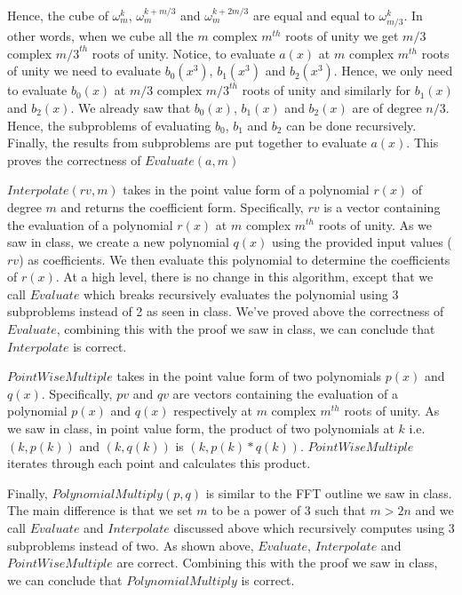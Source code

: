 \documentclass{article}
\begin{document}
    Hence, the cube of $\omega_m^k$, $\omega_m^{k+m/3}$ and $\omega_m^{k+2m/3}$ are equal and equal to $\omega_{m/3}^k$. In other words, when we cube all the $m$ complex $m^{th}$ roots of unity we get $m/3$ complex ${m/3}^{th}$ roots of unity. Notice, to evaluate $a(x)$ at $m$ complex $m^{th}$ roots of unity we need to evaluate $b_0(x^3)$, $b_1(x^3)$ and $b_2(x^3)$. Hence, we only need to evaluate $b_0(x)$ at $m/3$ complex ${m/3}^{th}$ roots of unity and similarly for $b_1(x)$ and $b_2(x)$. We already saw that $b_0(x)$, $b_1(x)$ and $b_2(x)$ are of degree $n/3$. Hence, the subproblems of evaluating $b_0$, $b_1$ and $b_2$ can be done recursively. Finally, the results from subproblems are put together to evaluate $a(x)$. This proves the correctness of $Evaluate(a, m)$

    $Interpolate(rv, m)$ takes in the point value form of a polynomial $r(x)$ of degree $m$ and returns the coefficient form. Specifically, $rv$ is a vector containing the evaluation of a polynomial $r(x)$ at $m$ complex $m^{th}$ roots of unity. As we saw in class, we create a new polynomial $q(x)$ using the provided input values ($rv$) as coefficients. We then evaluate this polynomial to determine the coefficients of $r(x)$. At a high level, there is no change in this algorithm, except that we call $Evaluate$ which breaks recursively evaluates the polynomial using 3 subproblems instead of 2 as seen in class. We've proved above the correctness of $Evaluate$, combining this with the proof we saw in class, we can conclude that $Interpolate$ is correct.

    $PointWiseMultiple$ takes in the point value form of two polynomials $p(x)$ and $q(x)$. Specifically, $pv$ and $qv$ are vectors containing the evaluation of a polynomial $p(x)$ and $q(x)$ respectively at $m$ complex $m^{th}$ roots of unity. As we saw in class, in point value form, the product of two polynomials at $k$ i.e. $(k, p(k))$ and $(k, q(k))$ is $(k, p(k)*q(k))$. $PointWiseMultiple$ iterates through each point and calculates this product.

    Finally, $PolynomialMultiply(p, q)$ is similar to the FFT outline we saw in class. The main difference is that we set $m$ to be a power of 3 such that $m > 2n$ and we call $Evaluate$ and $Interpolate$ discussed above which recursively computes using 3 subproblems instead of two. As shown above, $Evaluate$, $Interpolate$ and $PointWiseMultiple$ are correct. Combining this with the proof we saw in class, we can conclude that $PolynomialMultiply$ is correct.
\end{document}
